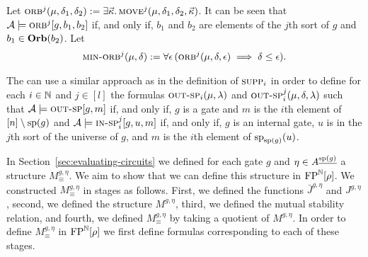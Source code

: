 \documentclass[../main/thesis.tex]{subfiles}
\begin{document}
Let $\textsc{orb}^j(\mu, \delta_1, \delta_2) := \exists \vec{\kappa} . \,
\textsc{move}^j(\mu, \delta_1, \delta_2, \vec{\kappa})$. It can be seen that
$\mathcal{A} \models \textsc{orb}^j [g, b_1, b_2]$ if, and only if, $b_1$ and $b_2$
are elements of the $j$th sort of $g$ and $b_1 \in \text{\textbf{Orb}}(b_2)$. Let
\begin{align*}
  \textsc{min-orb}^j (\mu, \delta) := \forall \epsilon \, (\textsc{orb}^j (\mu, \delta, \epsilon) \implies \delta \leq \epsilon). 
\end{align*}

The can use a similar approach as in the definition of $\textsc{supp}_i$ in order to
define for each $i \in \mathbb{N}$ and $j \in [l]$ the formulas $\textsc{out-sp}_i (\mu,
\lambda)$ and $\textsc{out-sp}^j_i(\mu, \delta, \lambda)$ such that $\mathcal{A}
\models \textsc{out-sp}[g, m]$ if, and only if, $g$ is a gate and $m$ is the $i$th
element of $[n] \setminus \text{sp}(g)$ and $\mathcal{A} \models \textsc{in-sp}^j_i[g,
u, m]$ if, and only if, $g$ is an internal gate, $u$ is in the $j$th sort of the
universe of $g$, and $m$ is the $i$th element of $\text{sp}_{\text{sp}(g)}(u)$.

In Section~\ref{sec:evaluating-circuits} we defined for each gate $g$ and $\eta
\in A^{\underline{\text{sp}(g)}}$ a structure $M^{g, \eta}_\equiv$. We aim to show
that we can define this structure in $\text{\upshape FP}^{\mathbb{N}}[\rho]$. We constructed $M^{g,
  \eta}_\equiv$ in stages as follows. First, we defined the functions
$\bar{J}^{g, \eta}$ and $J^{g, \eta}$, second, we defined the structure $M^{g,
  \eta}$, third, we defined the mutual stability relation, and fourth, we
defined $M^{g, \eta}_{\equiv}$ by taking a quotient of $M^{g, \eta}$. In order
to define $M^{g, \eta}_\equiv$ in $\text{\upshape FP}^{\mathbb{N}}[\rho]$ we first define formulas
corresponding to each of these stages.
\end{document}
